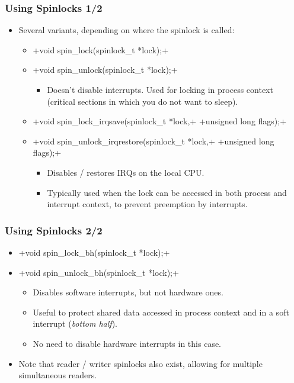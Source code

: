 \begin{frame}[fragile]
  \frametitle{Using Spinlocks 1/2}
  \begin{itemize}
  \item Several variants, depending on where the spinlock is called:
    \begin{itemize}
    \item {}+void spin_lock(spinlock_t *lock);+
    \item {}+void spin_unlock(spinlock_t *lock);+
      \begin{itemize}
      \item Doesn't disable interrupts. Used for locking in process
        context (critical sections in which you do not want to sleep).
      \end{itemize}
    \item {}+void spin_lock_irqsave(spinlock_t *lock,+
      +unsigned long flags);+
    \item {}+void spin_unlock_irqrestore(spinlock_t *lock,+
      +unsigned long flags);+
      \begin{itemize}
      \item Disables / restores IRQs on the local CPU.
      \item Typically used when the lock can be accessed in both process
        and interrupt context, to prevent preemption by interrupts.
      \end{itemize}
    \end{itemize}
  \end{itemize}
\end{frame}
\begin{frame}[fragile]
  \frametitle{Using Spinlocks 2/2}
  \begin{itemize}
  \item {}+void spin_lock_bh(spinlock_t *lock);+
  \item {}+void spin_unlock_bh(spinlock_t *lock);+
    \begin{itemize}
    \item Disables software interrupts, but not hardware ones.
    \item Useful to protect shared data accessed in process context
      and in a soft interrupt (\emph{bottom half}).
    \item No need to disable hardware interrupts in this case.
    \end{itemize}
  \item Note that reader / writer spinlocks also exist, allowing
	for multiple simultaneous readers.
  \end{itemize}
\end{frame}

